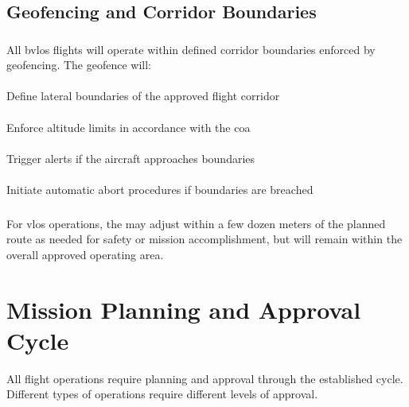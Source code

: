     \subsection{Geofencing and Corridor Boundaries}\label{ssec:geofencing}

        \subsubsection{} All \ac{bvlos} flights will operate within defined corridor boundaries enforced by geofencing. The geofence will:

            \paragraph{} Define lateral boundaries of the approved flight corridor
            \paragraph{} Enforce altitude limits in accordance with the \ac{coa}
            \paragraph{} Trigger alerts if the aircraft approaches boundaries
            \paragraph{} Initiate automatic abort procedures if boundaries are breached

        \subsubsection{} For \ac{vlos} operations, the  may adjust within a few dozen meters of the planned route as needed for safety or mission accomplishment, but will remain within the overall approved operating area.

\section{Mission Planning and Approval Cycle}\label{sec:missionplanningcycle}
All \projectmars{} flight operations require planning and approval through the established cycle. Different types of operations require different levels of approval.
